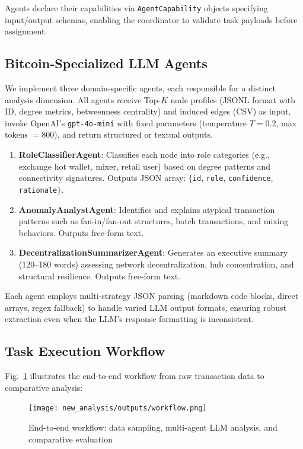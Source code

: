 Agents declare their capabilities via \texttt{AgentCapability} objects specifying input/output schemas, enabling the coordinator to validate task payloads before assignment.

\subsection{Bitcoin-Specialized LLM Agents}

We implement three domain-specific agents, each responsible for a distinct analysis dimension. All agents receive Top-$K$ node profiles (JSONL format with ID, degree metrics, betweenness centrality) and induced edges (CSV) as input, invoke OpenAI's \texttt{gpt-4o-mini} with fixed parameters (temperature $T{=}0.2$, max tokens ${=}800$), and return structured or textual outputs.

\begin{enumerate}
    \item \textbf{RoleClassifierAgent}: Classifies each node into role categories (e.g., exchange hot wallet, mixer, retail user) based on degree patterns and connectivity signatures. Outputs JSON array: $\{$\texttt{id}, \texttt{role}, \texttt{confidence}, \texttt{rationale}$\}$.
    
    \item \textbf{AnomalyAnalystAgent}: Identifies and explains atypical transaction patterns such as fan-in/fan-out structures, batch transactions, and mixing behaviors. Outputs free-form text.
    
    \item \textbf{DecentralizationSummarizerAgent}: Generates an executive summary (120--180 words) assessing network decentralization, hub concentration, and structural resilience. Outputs free-form text.
\end{enumerate}

Each agent employs multi-strategy JSON parsing (markdown code blocks, direct arrays, regex fallback) to handle varied LLM output formats, ensuring robust extraction even when the LLM's response formatting is inconsistent.

\subsection{Task Execution Workflow}

Fig.~\ref{fig:workflow} illustrates the end-to-end workflow from raw transaction data to comparative analysis:

\begin{figure}[!t]
  \centering
  \texttt{[image: new\_analysis/outputs/workflow.png]}
  \caption{End-to-end workflow: data sampling, multi-agent LLM analysis, and comparative evaluation}
  \label{fig:workflow}
\end{figure}


